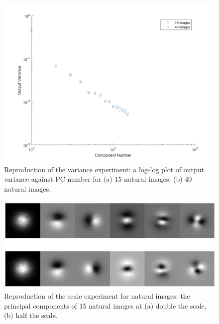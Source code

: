\begin{figure}
    \centering
    \includegraphics[scale=0.55]{figures/Figure4.png}
    \caption{Reproduction of the variance experiment: a log-log plot of output variance against PC number for (a) 15 natural images, (b) 40 natural images.}
    \label{fig:Figure4}
\end{figure}

 \begin{figure}
    \centering
    \includegraphics[scale=0.55]{figures/Figure5.png}
    \caption{Reproduction of the scale experiment for natural images: the principal components of 15 natural images at (a) double the scale, (b) half the scale.}
    \label{fig:Figure5}
\end{figure}

